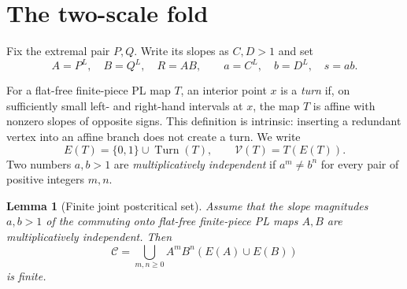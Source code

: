 \documentclass[11pt]{article}
\newtheorem{lemma}[theorem]{Lemma}
\newcommand{\Turn}{\operatorname{Turn}}
\begin{document}
\section{The two-scale fold}

Fix the extremal pair $P,Q$. Write its slopes as $C,D>1$ and set
\begin{equation}\label{eq:scales}
A=P^L,\quad B=Q^L,\quad R=AB,\qquad a=C^L,\quad b=D^L,\quad s=ab.
\end{equation}

For a flat-free finite-piece PL map $T$, an interior point $x$ is a \emph{turn} if, on sufficiently
small left- and right-hand intervals at $x$, the map $T$ is affine with nonzero slopes of opposite
signs. This definition is intrinsic: inserting a redundant vertex into an affine branch does not create
a turn. We write
\[
E(T)=\{0,1\}\cup\Turn(T),\qquad \mathcal V(T)=T(E(T)).
\]
Two numbers $a,b>1$ are \emph{multiplicatively independent} if
$a^m\ne b^n$ for every pair of positive integers $m,n$.

\begin{lemma}[Finite joint postcritical set]\label{lem:finite-postcritical}
Assume that the slope magnitudes $a,b>1$ of the commuting onto flat-free finite-piece PL maps $A,B$
are multiplicatively independent. Then
\begin{equation}\label{eq:postcritical}
\mathcal C=\bigcup_{m,n\ge0}A^mB^n(E(A)\cup E(B))
\end{equation}
is finite.
\end{lemma}
\end{document}
